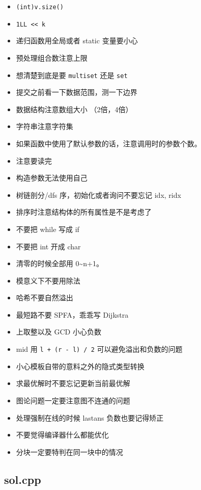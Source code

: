 \documentclass[]{article}
\providecommand{\tightlist}{%
  \setlength{\itemsep}{0pt}\setlength{\parskip}{0pt}}
\begin{document}
\begin{itemize}
\tightlist
\item
  \texttt{(int)v.size()}
\item
  \texttt{1LL\ \textless{}\textless{}\ k}
\item
  递归函数用全局或者 static 变量要小心
\item
  预处理组合数注意上限
\item
  想清楚到底是要 \texttt{multiset} 还是 \texttt{set}
\item
  提交之前看一下数据范围，测一下边界
\item
  数据结构注意数组大小 （2倍，4倍）
\item
  字符串注意字符集
\item
  如果函数中使用了默认参数的话，注意调用时的参数个数。
\item
  注意要读完
\item
  构造参数无法使用自己
\item
  树链剖分/dfs 序，初始化或者询问不要忘记 idx, ridx
\item
  排序时注意结构体的所有属性是不是考虑了
\item
  不要把 while 写成 if
\item
  不要把 int 开成 char
\item
  清零的时候全部用 0\textasciitilde{}n+1。
\item
  模意义下不要用除法
\item
  哈希不要自然溢出
\item
  最短路不要 SPFA，乖乖写 Dijkstra
\item
  上取整以及 GCD 小心负数
\item
  mid 用 \texttt{l\ +\ (r\ -\ l)\ /\ 2} 可以避免溢出和负数的问题
\item
  小心模板自带的意料之外的隐式类型转换
\item
  求最优解时不要忘记更新当前最优解
\item
  图论问题一定要注意图不连通的问题
\item
  处理强制在线的时候 lastans 负数也要记得矫正
\item
  不要觉得编译器什么都能优化
\item
  分块一定要特判在同一块中的情况
\end{itemize}

\hypertarget{sol.cpp}{%
\subsection{sol.cpp}\label{sol.cpp}}
\end{document}
